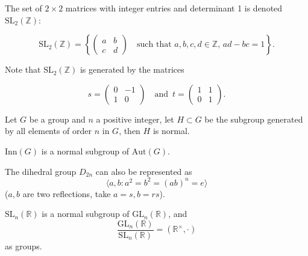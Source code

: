 \documentclass[openany]{book}
\newcommand{\R}{\mathbb{R}}
\newcommand{\la}{\langle}
\newcommand{\ra}{\rangle}
\begin{document}
\begin{prop}[6.10]
    The set of \( 2 \times 2 \) matrices with integer entries and determinant 1 is denoted \(\text{SL}_2(\mathbb{Z})\):

\[
\text{SL}_2(\mathbb{Z}) = \left\{ 
\begin{pmatrix}
a & b \\
c & d
\end{pmatrix} 
\quad \text{such that } a, b, c, d \in \mathbb{Z}, \, ad - bc = 1 \right\}.
\]

Note that \(\text{SL}_2(\mathbb{Z})\) is generated by the matrices

\[
s = 
\begin{pmatrix}
0 & -1 \\
1 & 0
\end{pmatrix} \quad \text{and } \, t = 
\begin{pmatrix}
1 & 1 \\
0 & 1
\end{pmatrix}.
\]

\end{prop}

\begin{prop}[7.7]
    Let $G$ be a group and $n$ a positive integer, let $H\subset G$ be the subgroup generated by all elements of order $n$ in $G$, then $H$ is normal.
\end{prop}

\begin{prop}[7.14]
    $\text{Inn}(G)$ is a normal subgroup of $\text{Aut}(G)$.
\end{prop}

\begin{prop}[8.4]
    The dihedral group $D_{2n}$ can also be represented as 
    \begin{equation*}
        \la a,b: a^2=b^2=(ab)^n=e\ra
    \end{equation*}
    ($a,b$ are two reflections, take $a=s, b=rs$).
\end{prop}

\begin{prop}[8.8]
    $\text{SL}_n(\R)$ is a normal subgroup of $\text{GL}_n(\R)$, and 
    \begin{equation*}
        \frac{\text{GL}_n(\R)}{\text{SL}_n(\R)}=(\R^\times,\cdot)
    \end{equation*}
    as groups.
\end{prop}
\end{document}
